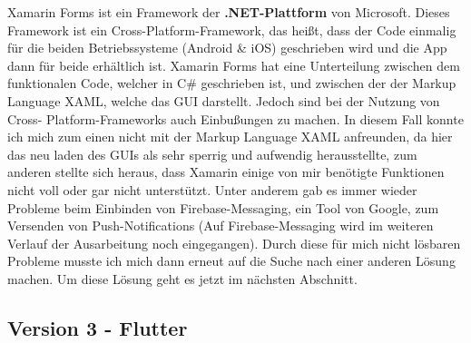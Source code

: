     Xamarin Forms ist ein Framework der \textbf{.NET-Plattform} von Microsoft. Dieses 
    Framework ist ein Cross-Platform-Framework, das heißt, dass der Code einmalig für 
    die beiden Betriebssysteme (Android \& iOS) geschrieben wird und die App dann für 
    beide erhältlich ist. Xamarin Forms hat eine Unterteilung zwischen dem funktionalen 
    Code, welcher in C\# geschrieben ist, und zwischen der der Markup Language XAML, 
    welche das GUI darstellt\cite[vgl.]{Xamarin}. Jedoch sind bei der Nutzung von Cross-
    Platform-Frameworks auch Einbußungen zu machen. In diesem Fall konnte ich mich zum 
    einen nicht mit der Markup Language XAML anfreunden, da hier das neu laden des GUIs 
    als sehr sperrig und aufwendig herausstellte, zum anderen stellte sich heraus, dass 
    Xamarin einige von mir benötigte Funktionen nicht voll oder gar nicht unterstützt. 
    Unter anderem gab es immer wieder Probleme beim Einbinden von Firebase-Messaging, ein
    Tool von Google, zum Versenden von Push-Notifications (Auf Firebase-Messaging wird im
    weiteren Verlauf der Ausarbeitung noch eingegangen).
    Durch diese für mich nicht lösbaren Probleme musste ich mich dann erneut auf die Suche
    nach einer anderen Lösung machen. Um diese Lösung geht es jetzt im nächsten Abschnitt.

\subsection{Version 3 - Flutter}

